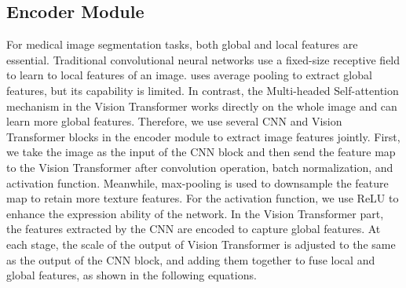 \documentclass{article}
\begin{document}
\subsection{Encoder Module}
\vspace{-1mm}
For medical image segmentation tasks, both global and local features are essential. Traditional convolutional neural networks use a fixed-size receptive field to learn to local features of an image. \cite{huang2021gloria} uses average pooling to extract global features, but its capability is limited. In contrast, the Multi-headed Self-attention mechanism in the Vision Transformer works directly on the whole image and can learn more global features. Therefore, we use several CNN and Vision Transformer blocks in the encoder module to extract image features jointly. First, we take the image as the input of the CNN block and then send the feature map to the Vision Transformer after convolution operation, batch normalization, and activation function. Meanwhile, max-pooling is used to downsample the feature map to retain more texture features.
For the activation function, we use ReLU to enhance the expression ability of the network. In the Vision Transformer part,  the features extracted by the CNN are encoded to capture global features. At each stage, the scale of the output of Vision Transformer is adjusted to the same as the output of the CNN block, and adding them together to fuse local and global features, as shown in the following equations.
\vspace{-2mm}
\end{document}
